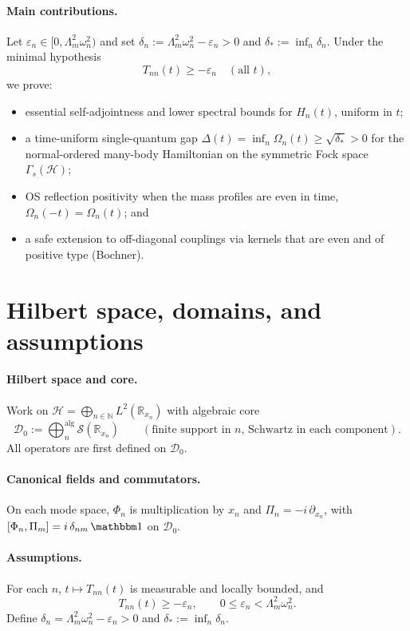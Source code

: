 \documentclass[11pt]{article}
\theoremstyle{plain}
\theoremstyle{definition}
\theoremstyle{remark}
\newcommand{\R}{\mathbb{R}}
\newcommand{\N}{\mathbb{N}}
\newcommand{\Hcal}{\mathcal{H}}
\newcommand{\Dcal}{\mathcal{D}}
\begin{document}
\paragraph{Main contributions.}
Let $\varepsilon_n\in[0,\Lambda_m^2\omega_n^2)$ and set $\delta_n:=\Lambda_m^2\omega_n^2-\varepsilon_n>0$ and $\delta_*:=\inf_n\delta_n$. Under the minimal hypothesis
\begin{equation}\label{eq:A3}
T_{nn}(t)\ge-\varepsilon_n\quad (\text{all }t),
\end{equation}
we prove:
\begin{itemize}[leftmargin=*]
  \item essential self-adjointness and lower spectral bounds for $H_n(t)$, uniform in $t$;
  \item a time-uniform single-quantum gap $\Delta(t)=\inf_n\Omega_n(t)\ge\sqrt{\delta_*}>0$ for the normal-ordered many-body Hamiltonian on the symmetric Fock space $\Gamma_s(\Hcal)$;
  \item OS reflection positivity when the mass profiles are even in time, $\Omega_n(-t)=\Omega_n(t)$; and
  \item a safe extension to off-diagonal couplings via kernels that are even and of positive type (Bochner).
\end{itemize}

\section{Hilbert space, domains, and assumptions}\label{sec:setup}
\paragraph{Hilbert space and core.} Work on $\Hcal=\bigoplus_{n\in\N}L^2(\R_{x_n})$ with algebraic core
\[
\Dcal_0:=\bigoplus_{n}^{\mathrm{alg}} \mathcal S(\R_{x_n})\qquad(\text{finite support in $n$, Schwartz in each component}).
\]
All operators are first defined on $\Dcal_0$.

\paragraph{Canonical fields and commutators.} On each mode space, $\Phi_n$ is multiplication by $x_n$ and $\Pi_n=-i\,\partial_{x_n}$, with $[\Phi_n,\Pi_m]=i\,\delta_{nm}\,\mathbbm 1$ on $\Dcal_0$.

\paragraph{Assumptions.} For each $n$, $t\mapsto T_{nn}(t)$ is measurable and locally bounded, and
\begin{equation}\label{eq:uniformLower}
T_{nn}(t)\ge-\varepsilon_n,\qquad 0\le \varepsilon_n<\Lambda_m^2\omega_n^2.
\end{equation}
Define $\delta_n=\Lambda_m^2\omega_n^2-\varepsilon_n>0$ and $\delta_*:=\inf_n\delta_n$.
\end{document}
